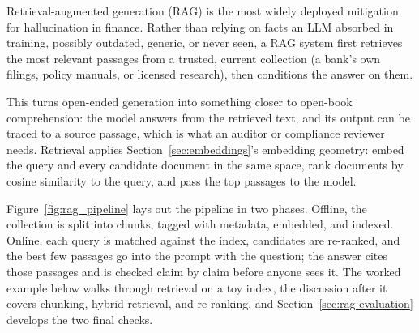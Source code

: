 \documentclass[../ai_in_finance]{subfiles}
\begin{document}
Retrieval-augmented generation (RAG) is the most widely deployed mitigation for hallucination in finance. Rather than relying on facts an LLM absorbed in training, possibly outdated, generic, or never seen, a RAG system first retrieves the most relevant passages from a trusted, current collection (a bank's own filings, policy manuals, or licensed research), then conditions the answer on them.

This turns open-ended generation into something closer to open-book comprehension: the model answers from the retrieved text, and its output can be traced to a source passage, which is what an auditor or compliance reviewer needs. Retrieval applies Section~\ref{sec:embeddings}'s embedding geometry: embed the query and every candidate document in the same space, rank documents by cosine similarity to the query, and pass the top passages to the model.

Figure~\ref{fig:rag_pipeline} lays out the pipeline in two phases. Offline, the collection is split into chunks, tagged with metadata, embedded, and indexed. Online, each query is matched against the index, candidates are re-ranked, and the best few passages go into the prompt with the question; the answer cites those passages and is checked claim by claim before anyone sees it. The worked example below walks through retrieval on a toy index, the discussion after it covers chunking, hybrid retrieval, and re-ranking, and Section~\ref{sec:rag-evaluation} develops the two final checks.
\end{document}
